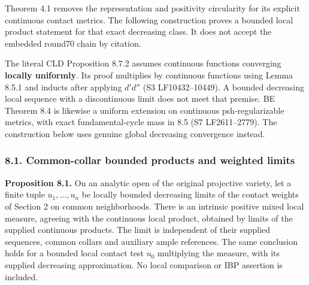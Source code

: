 \documentclass[
  10pt,
]{article}
\begin{document}
Theorem 4.1 removes the representation and positivity circularity for
its explicit continuous contact metrics. The following construction
proves a bounded local product statement for that exact decreasing
class. It does not accept the embedded round70 chain by citation.

The literal CLD Proposition 8.7.2 assumes continuous functions
converging \textbf{locally uniformly}. Its proof multiplies by
continuous functions using Lemma 8.5.1 and inducts after applying
\(d'd''\) (S3 LF10432--10449). A bounded decreasing local sequence with
a discontinuous limit does not meet that premise. BE Theorem 8.4 is
likewise a uniform extension on continuous psh-regularizable metrics,
with exact fundamental-cycle mass in 8.5 (S7 LF2611--2779). The
construction below uses genuine global decreasing convergence instead.

\subsubsection{8.1. Common-collar bounded products and weighted
limits}\label{common-collar-bounded-products-and-weighted-limits}

\textbf{Proposition 8.1.} On an analytic open of the original projective
variety, let a finite tuple \(u_1,\ldots,u_n\) be locally bounded
decreasing limits of the contact weights of Section 2 on common
neighborhoods. There is an intrinsic positive mixed local measure,
agreeing with the continuous local product, obtained by limits of the
supplied continuous products. The limit is independent of their supplied
sequences, common collars and auxiliary ample references. The same
conclusion holds for a bounded local contact test \(u_0\) multiplying
the measure, with its supplied decreasing approximation. No local
comparison or IBP assertion is included.
\end{document}
